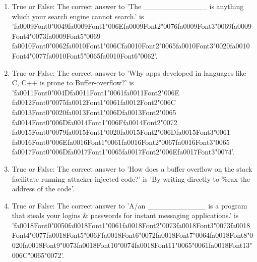 \documentclass[12pt]{article}
\begin{document}
\begin{enumerate}[label=\arabic*.]
\item True or False: The correct answer to 'The \_\_\_\_\_\_\_\_\_\_\_\_ is anything which your search engine cannot search.' is '{\csname fa0009Font0\endcsname\char"0049}{\csname fa0009Font1\endcsname\char"006E}{\csname fa0009Font2\endcsname\char"0076}{\csname fa0009Font3\endcsname\char"0069}{\csname fa0009Font4\endcsname\char"0073}{\csname fa0009Font5\endcsname\char"0069} {\csname fa0010Font0\endcsname\char"0062}{\csname fa0010Font1\endcsname\char"006C}{\csname fa0010Font2\endcsname\char"0065}{\csname fa0010Font3\endcsname\char"0020}{\csname fa0010Font4\endcsname\char"0077}{\csname fa0010Font5\endcsname\char"0065}{\csname fa0010Font6\endcsname\char"0062}'.
\item True or False: The correct answer to 'Why apps developed in languages like C, C++ is prone to Buffer-overflow?' is '{\csname fa0011Font0\endcsname\char"004D}{\csname fa0011Font1\endcsname\char"0061}{\csname fa0011Font2\endcsname\char"006E} {\csname fa0012Font0\endcsname\char"0075}{\csname fa0012Font1\endcsname\char"0061}{\csname fa0012Font2\endcsname\char"006C} {\csname fa0013Font0\endcsname\char"0020}{\csname fa0013Font1\endcsname\char"006D}{\csname fa0013Font2\endcsname\char"0065} {\csname fa0014Font0\endcsname\char"006D}{\csname fa0014Font1\endcsname\char"006F}{\csname fa0014Font2\endcsname\char"0072} {\csname fa0015Font0\endcsname\char"0079}{\csname fa0015Font1\endcsname\char"0020}{\csname fa0015Font2\endcsname\char"006D}{\csname fa0015Font3\endcsname\char"0061} {\csname fa0016Font0\endcsname\char"006E}{\csname fa0016Font1\endcsname\char"0061}{\csname fa0016Font2\endcsname\char"0067}{\csname fa0016Font3\endcsname\char"0065} {\csname fa0017Font0\endcsname\char"006D}{\csname fa0017Font1\endcsname\char"0065}{\csname fa0017Font2\endcsname\char"006E}{\csname fa0017Font3\endcsname\char"0074}'.
\item True or False: The correct answer to 'How does a buffer overflow on the stack facilitate running attacker-injected code?' is 'By writing directly to \%eax the address of the code'.
\item True or False: The correct answer to 'A/an \_\_\_\_\_\_\_\_\_\_\_ is a program that steals your logins \& passwords for instant messaging applications.' is '{\csname fa0018Font0\endcsname\char"0050}{\csname fa0018Font1\endcsname\char"0061}{\csname fa0018Font2\endcsname\char"0073}{\csname fa0018Font3\endcsname\char"0073}{\csname fa0018Font4\endcsname\char"0077}{\csname fa0018Font5\endcsname\char"006F}{\csname fa0018Font6\endcsname\char"0072}{\csname fa0018Font7\endcsname\char"0064}{\csname fa0018Font8\endcsname\char"0020}{\csname fa0018Font9\endcsname\char"0073}{\csname fa0018Font10\endcsname\char"0074}{\csname fa0018Font11\endcsname\char"0065}{\char"0061}{\csname fa0018Font13\endcsname\char"006C}{\char"0065}{\char"0072}'.

\end{enumerate}
\end{document}
